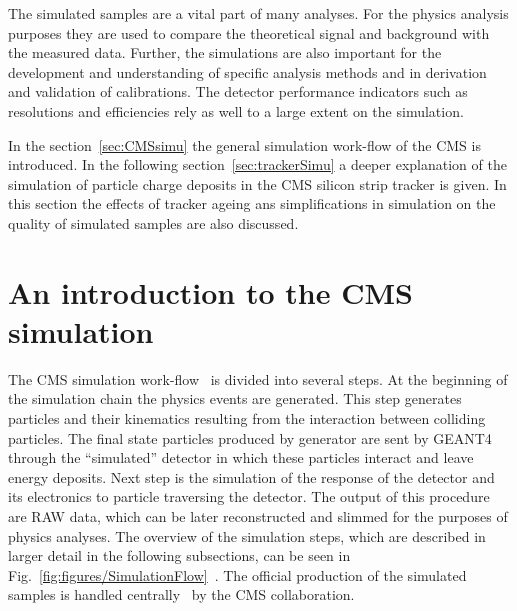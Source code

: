 
\clearpage

\setcounter{secnumdepth}{4}
\setcounter{secnumdepth}{5}


The simulated samples are a vital part of many analyses. For the physics analysis purposes they are used to compare the theoretical signal and background with the measured data. Further, the simulations are also important for the development and understanding of specific analysis methods and in derivation and validation of calibrations. The detector performance indicators such as resolutions and efficiencies rely as well to a large extent on the simulation.

In the section~\ref{sec:CMSsimu} the general simulation work-flow of the CMS is introduced. In the following section~\ref{sec:trackerSimu} a deeper explanation of the simulation of particle charge deposits in the CMS silicon strip tracker is given. In this section the effects of tracker ageing ans simplifications in simulation on the quality of simulated samples are also discussed.

\section{An introduction to the CMS simulation~\label{sec:CMSsimu}}

The CMS simulation work-flow~\cite{Banerjee:2007zz, Hildreth:2017vpw, Hildreth:2015kps} is divided into several steps. At the beginning of the simulation chain the physics events are generated. This step generates particles and their kinematics resulting from the interaction between colliding particles. The final state particles produced by generator are sent by GEANT4 through the ``simulated'' detector in which these particles interact and leave energy deposits. Next step is the simulation of the response of the detector and its electronics to particle traversing the detector. The output of this procedure are RAW data, which can be later reconstructed and slimmed for the purposes of physics analyses. The overview of the simulation steps, which are described in larger detail in the following subsections, can be seen in Fig.~\ref{fig:figures/SimulationFlow}~\cite{website:simuBasics}. The official production of the simulated samples is handled centrally~\cite{Boudoul:2015bkp} by the CMS collaboration.

